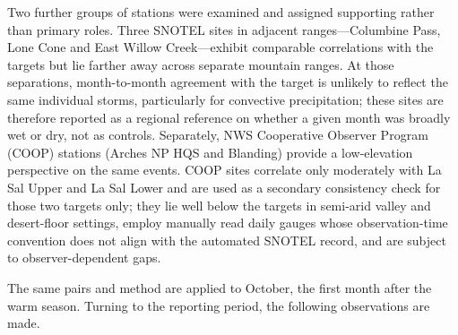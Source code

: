 \documentclass[11pt]{article}
\begin{document}
Two further groups of stations were examined and assigned supporting rather than primary roles.
Three SNOTEL sites in adjacent ranges---Columbine Pass, Lone Cone and East Willow
Creek---exhibit comparable correlations with the targets but lie farther away across separate
mountain ranges. At those separations, month-to-month agreement with the target is unlikely to
reflect the same individual storms, particularly for convective precipitation; these sites are
therefore reported as a regional reference on whether a given month was broadly wet or dry, not as controls. Separately, NWS
Cooperative Observer Program (COOP) stations (Arches NP HQS and Blanding) provide a
low-elevation perspective on the same events. COOP sites correlate only moderately with La Sal
Upper and La Sal Lower and are used as a secondary consistency check for those two targets
only; they lie well below the targets in semi-arid valley and desert-floor settings, employ
manually read daily gauges whose observation-time convention does not align with the automated
SNOTEL record, and are subject to observer-dependent gaps.

The same pairs and method are applied to October, the first month after the warm season.
Turning to the reporting period, the following observations are made.
 
\end{document}
